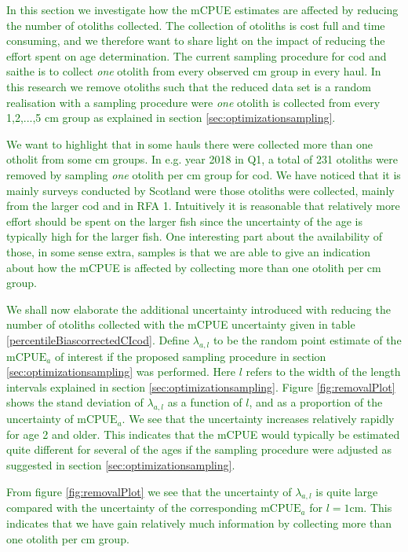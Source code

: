 \documentclass[a4paper 12pt]{article}
\numberwithin{equation}{section}
\newcommand{\olav}[1]{\textcolor{darkgreen}{#1}}
\begin{document}
\olav{In this section we investigate how the mCPUE estimates are affected by reducing the number of otoliths collected. The collection of otoliths is cost full and time consuming, and we therefore want to share light on the impact of reducing the effort spent on age determination. The current sampling procedure for cod and saithe is to collect \textit{one} otolith from every observed cm group in every haul. In this research we remove otoliths such that the reduced data set is a random realisation with a sampling procedure were \textit{one} otolith is collected from every 1,2,...,5 cm group as explained in section \ref{sec:optimizationsampling}. }

\olav{We want to highlight that in some hauls there were collected more than one otholit from some cm groups. In e.g. year 2018 in Q1, a total of 231 otoliths were removed by sampling \textit{one} otolith per cm group for cod. We have noticed that it is mainly surveys conducted by Scotland were those otoliths were collected, mainly from the larger cod and in RFA 1. Intuitively it is reasonable that relatively more effort should be spent on the larger fish since the uncertainty of the age is typically high for the larger fish. One interesting part about the availability of those, in some sense extra, samples is that we are able to give an indication about how the mCPUE is affected by collecting more than one otolith per cm group.}

\olav{We shall now elaborate the additional uncertainty introduced with reducing the number of otoliths collected with the mCPUE uncertainty given in table \ref{percentileBiascorrectedCIcod}. Define $\lambda_{a,l}$ to be the random point estimate of the $\text{mCPUE}_a$ of interest if the proposed sampling procedure in section \ref{sec:optimizationsampling} was performed. Here $l$ refers to the width of the length intervals explained in section \ref{sec:optimizationsampling}.  Figure \ref{fig:removalPlot} shows the stand deviation of $\lambda_{a,l}$ as a function of $l$, and as a proportion of the uncertainty of $\text{mCPUE}_a$. We see that the uncertainty increases relatively rapidly for age 2 and older. This indicates that the mCPUE would typically be estimated quite different for several of the ages if the sampling procedure were adjusted as suggested in section \ref{sec:optimizationsampling}.}

\olav{From figure \ref{fig:removalPlot} we see that the uncertainty of $\lambda_{a,l}$ is quite large compared with the uncertainty of the corresponding $\text{mCPUE}_a$ for $l = 1$cm. This indicates that we have gain relatively much information by collecting more than one otolith per cm group.}
\end{document}
